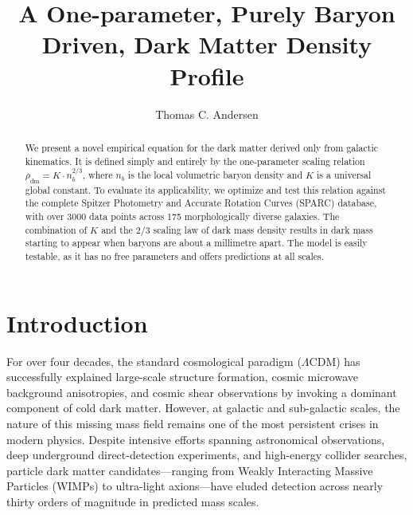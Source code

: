 \documentclass[twocolumn]{aastex631}
\begin{document}
\title{A One-parameter, Purely Baryon Driven, Dark Matter Density Profile}

\author[0000-0003-1614-4124]{Thomas C. Andersen}

\begin{abstract}
We present a novel empirical equation for the dark matter derived only from galactic kinematics. It is defined simply and entirely by the one-parameter scaling relation $\rho_{\text{dm}} = K \cdot n_b^{2/3}$, where $n_b$ is the local volumetric baryon density and $K$ is a universal global constant. To evaluate its applicability, we optimize and test this relation against the complete Spitzer Photometry and Accurate Rotation Curves (SPARC) database, with over 3000 data points across 175 morphologically diverse galaxies. The combination of $K$ and the  $2/3$ scaling law of dark mass density results in dark mass starting to appear when baryons are about a millimetre apart. The model is easily testable, as it has no free parameters and offers predictions at all scales.   
\end{abstract}


\section{Introduction} \label{sec:intro}

For over four decades, the standard cosmological paradigm ($\Lambda$CDM) has successfully explained large-scale structure formation, cosmic microwave background anisotropies, and cosmic shear observations by invoking a dominant component of cold dark matter. However, at galactic and sub-galactic scales, the nature of this missing mass field remains one of the most persistent crises in modern physics. Despite intensive efforts spanning astronomical observations, deep underground direct-detection experiments, and high-energy collider searches, particle dark matter candidates---ranging from Weakly Interacting Massive Particles (WIMPs) to ultra-light axions---have eluded detection across nearly thirty orders of magnitude in predicted mass scales. 
\end{document}
